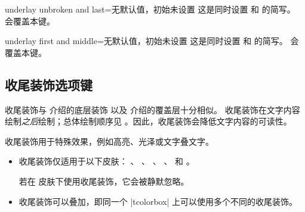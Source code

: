 \begin{docTcbKey}{underlay unbroken and last}{=}{无默认值，初始未设置}
  这是同时设置
   和
   的简写。
   会覆盖本键。
\end{docTcbKey}

\begin{docTcbKey}[][doc new=2014-09-19]{underlay first and middle}{=}{无默认值，初始未设置}
  这是同时设置
   和
   的简写。
   会覆盖本键。
\end{docTcbKey}


\clearpage
\subsection{收尾装饰选项键}\label{subsec:skinfinish}

收尾装饰与  介绍的底层装饰
以及  介绍的覆盖层十分相似。
收尾装饰在文字内容绘制\emph{之后}绘制；总体绘制顺序见
。因此，收尾装饰会降低文字内容的可读性。

收尾装饰用于特殊效果，例如高亮、光泽或文字叠文字。

\begin{itemize}
\item 收尾装饰仅适用于以下皮肤：
  、
  、
  、
  、
   和
  。
  \begin{marker}
  若在  皮肤下使用收尾装饰，它会被静默忽略。
  \end{marker}
\item 收尾装饰可以叠加，即同一个 |tcolorbox| 上可以使用多个不同的收尾装饰。
\end{itemize}


